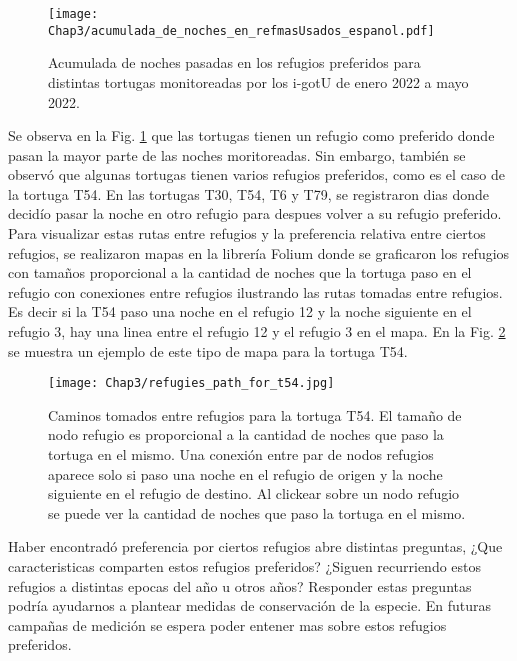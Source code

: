 \begin{figure}[ht]
    \begin{center}
        \texttt{[image: Chap3/acumulada\_de\_noches\_en\_refmasUsados\_espanol.pdf]}
        \caption[Acumulada de noches pasadas en los refugios preferidos.]{Acumulada de noches pasadas en los refugios preferidos para distintas tortugas monitoreadas por los i-gotU de enero 2022 a mayo 2022.} 
        \label{fig:refugios_preferidos}
        
        \end{center}
\end{figure}
Se observa en la Fig. \ref{fig:refugios_preferidos} que las tortugas tienen un refugio como preferido donde pasan la mayor parte de las noches moritoreadas. Sin embargo, también se observó que algunas tortugas tienen varios refugios preferidos, como es el caso de la tortuga T54. En las tortugas T30, T54, T6 y T79, se registraron dias donde decidío pasar la noche en otro refugio para despues volver a su refugio preferido. Para visualizar estas rutas entre refugios y la preferencia relativa entre ciertos refugios, se realizaron mapas en la librería Folium donde se graficaron los refugios con tamaños proporcional a la cantidad de noches que la tortuga paso en el refugio con conexiones entre refugios ilustrando las rutas tomadas entre refugios. Es decir si la T54 paso una noche en el refugio 12 y la noche siguiente en el refugio 3, hay una linea entre el refugio 12 y el refugio 3 en el mapa. En la Fig. \ref{fig:ruta_refus_T54} se muestra un ejemplo de este tipo de mapa para la tortuga T54.

\begin{figure}[ht]
    \begin{center}
        \texttt{[image: Chap3/refugies\_path\_for\_t54.jpg]}
        \caption[Caminos tomados entre refugios para la tortuga T54.]{Caminos tomados entre refugios para la tortuga T54. El tamaño de nodo refugio es proporcional a la cantidad de noches que paso la tortuga en el mismo. Una conexión entre par de nodos refugios aparece solo si paso una noche en el refugio de origen y la noche siguiente en el refugio de destino. Al clickear sobre un nodo refugio se puede ver la cantidad de noches que paso la tortuga en el mismo.} 
        \label{fig:ruta_refus_T54}
        
        \end{center}
\end{figure} 
Haber encontradó preferencia por ciertos refugios abre distintas preguntas, ¿Que caracteristicas comparten estos refugios preferidos? ¿Siguen recurriendo estos refugios a distintas epocas del año u otros años?  Responder estas preguntas podría ayudarnos a plantear medidas de conservación de la especie. En futuras campañas de medición se espera poder entener mas sobre estos refugios preferidos.




